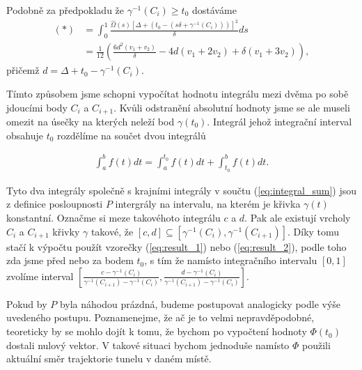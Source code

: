 Podobně za předpokladu že $ \gamma^{-1}(C_i) \geq t_0$ dostáváme
\begin{align}
    (*) &= \int_{0}^{1}
        \frac{\widehat{\Omega}(s)
            \left[\Delta + (t_0 - (s \delta + \gamma^{-1}(C_i)) ) \right]^2}
        {\delta}
         ds \\
    &= \frac{1}{12} \left(
        \frac{6 d^2 (v_1+v_2 )}{\delta}
        - 4 d (v_1+2 v_2 )
        + \delta (v_1+3 v_2 ) \right), \label{eq:result_2}
\end{align}
přičemž $ d = \Delta + t_0 - \gamma^{-1}(C_i) $.

Tímto způsobem jsme schopni vypočítat hodnotu integrálu mezi dvěma po sobě jdoucími
body $ C_i $ a $ C_{i + 1} $. Kvůli odstranění absolutní hodnoty jsme se ale
museli omezit na úsečky na kterých neleží bod $ \gamma(t_0) $. Integrál jehož
integrační interval obsahuje $ t_0 $ rozdělíme na součet dvou
integrálů

\begin{align*}
    \int_{a}^{b} f(t) dt = \int_{a}^{t_0} f(t) dt + \int_{t_0}^{b} f(t) dt.
\end{align*}

Tyto dva integrály společně s krajními integrály v součtu (\ref{eq:integral_sum})
jsou z definice posloupnosti $ P $ intergrály na intervalu, na kterém je křivka
$ \gamma(t) $ konstantní. Označme si meze takovéhoto integrálu $ c $ a $ d $.
Pak ale existují vrcholy $ C_i $ a $ C_{i + 1} $ křivky $ \gamma $ takové, že
$ [c, d] \subseteq [\gamma^{-1}(C_i), \gamma^{-1}(C_{i + 1})] $. Díky tomu stačí
k výpočtu použít vzorečky (\ref{eq:result_1}) nebo (\ref{eq:result_2}), podle
toho zda jsme před nebo za bodem $ t_0 $, s tím že
namísto integračního intervalu $ [0, 1] $ zvolíme interval
$ \left[ \frac{c - \gamma^{-1}(C_i)}{\gamma^{-1}(C_{i + 1}) - \gamma^{-1}(C_i)},
 \frac{d - \gamma^{-1}(C_i)}{\gamma^{-1}(C_{i + 1}) - \gamma^{-1}(C_i)} \right] $.

Pokud by $ P $ byla náhodou prázdná, budeme postupovat
analogicky podle výše uvedeného postupu. Poznamenejme, že ač je to velmi
nepravděpodobné, teoreticky by se mohlo dojít k tomu, že bychom po vypočtení
hodnoty $ \Phi(t_0) $ dostali nulový vektor. V takové situaci bychom jednoduše
namísto $ \Phi $ použili aktuální směr trajektorie tunelu v daném místě.


